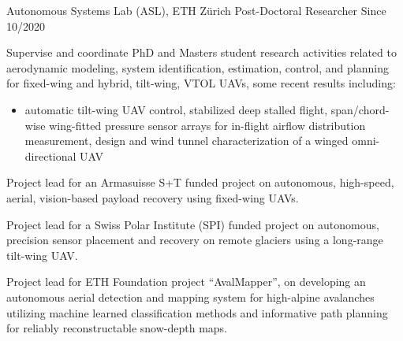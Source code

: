 \label{sec:exp}

\vspace{-8pt}
\begin{cventries}
%
\cvexpentry
  	{Autonomous Systems Lab (ASL), ETH Z\"{u}rich} %
  	{Post-Doctoral Researcher} %
    {} %
    {Since 10/2020} %
    {
      \begin{cvitems} %
      	\item Supervise and coordinate PhD and Masters student research activities related to aerodynamic modeling, system identification, estimation, control, and planning for fixed-wing and hybrid, tilt-wing, VTOL UAVs, some recent results including:
		\begin{itemize}
			\item automatic tilt-wing UAV control, stabilized deep stalled flight, span/chord-wise wing-fitted pressure sensor arrays for in-flight airflow distribution measurement, design and wind tunnel characterization of a winged omni-directional UAV
		\end{itemize}		      		
      	\item Project lead for an Armasuisse S+T funded project on autonomous, high-speed, aerial, vision-based payload recovery using fixed-wing UAVs.
      	\item Project lead for a Swiss Polar Institute (SPI) funded project on autonomous, precision sensor placement and recovery on remote glaciers using a long-range tilt-wing UAV.
      	\item Project lead for ETH Foundation project ``AvalMapper'', on developing an autonomous aerial detection and mapping system for high-alpine avalanches utilizing machine learned classification methods and informative path planning for reliably reconstructable snow-depth maps.

\end{cvitems}}
\end{cventries}
